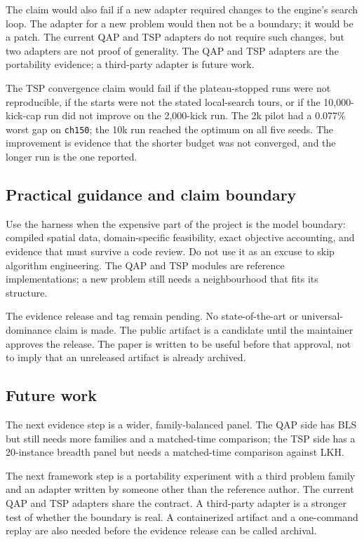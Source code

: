 \documentclass[11pt]{article}
\begin{document}
The claim would also fail if a new adapter required changes to the engine's search loop. The adapter
for a new problem would then not be a boundary; it would be a patch. The current QAP and TSP adapters
do not require such changes, but two adapters are not proof of generality. The QAP and TSP adapters are the portability evidence; a third-party adapter is future work.

The TSP convergence claim would fail if the plateau-stopped runs were not reproducible, if the starts
were not the stated local-search tours, or if the 10,000-kick-cap run did not improve on the
2,000-kick run.
The 2k pilot had a 0.077\% worst gap on \texttt{ch150}; the 10k run reached the optimum on all five
seeds. The improvement is evidence that the shorter budget was not converged, and the longer run is
the one reported.

\subsection{Practical guidance and claim boundary}

Use the harness when the expensive part of the project is the model boundary: compiled spatial data,
domain-specific feasibility, exact objective accounting, and evidence that must survive a code review.
Do not use it as an excuse to skip algorithm engineering. The QAP and TSP modules are reference
implementations; a new problem still needs a neighbourhood that fits its structure.

The evidence release and tag remain pending. No state-of-the-art or universal-dominance claim is made.
The public artifact is a candidate until the maintainer approves the release. The paper is written to
be useful before that approval, not to imply that an unreleased artifact is already archived.

\subsection{Future work}

The next evidence step is a wider, family-balanced panel. The QAP side has BLS but still needs more
families and a matched-time comparison; the TSP side has a 20-instance breadth panel but needs a
matched-time comparison against LKH. 

The next framework step is a portability experiment with a third problem family and an adapter
written by someone other than the reference author. The current QAP and TSP adapters share the contract. A
third-party adapter is a stronger test of whether the boundary is real. A
containerized artifact and a one-command replay are also needed before the evidence release can be
called archival.
\end{document}
